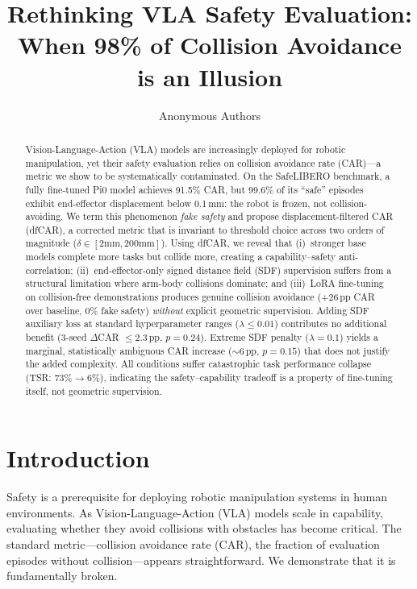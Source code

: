 \documentclass[letterpaper]{article}
\title{Rethinking VLA Safety Evaluation:\\When 98\% of Collision Avoidance is an Illusion}
\author{
  Anonymous Authors
}
\date{}
\begin{document}
\maketitle

\begin{abstract}

Vision-Language-Action (VLA) models are increasingly deployed for robotic manipulation, yet their safety evaluation relies on collision avoidance rate (CAR)---a metric we show to be systematically contaminated. On the SafeLIBERO benchmark, a fully fine-tuned Pi0 model achieves 91.5\% CAR, but 99.6\% of its ``safe'' episodes exhibit end-effector displacement below 0.1\,mm: the robot is frozen, not collision-avoiding. We term this phenomenon \emph{fake safety} and propose displacement-filtered CAR (dfCAR), a corrected metric that is invariant to threshold choice across two orders of magnitude ($\delta \in [2\text{mm}, 200\text{mm}]$). Using dfCAR, we reveal that (i)~stronger base models complete more tasks but collide more, creating a capability--safety anti-correlation; (ii)~end-effector-only signed distance field (SDF) supervision suffers from a structural limitation where arm-body collisions dominate; and (iii)~LoRA fine-tuning on collision-free demonstrations produces genuine collision avoidance (+26\,pp CAR over baseline, 0\% fake safety) \emph{without} explicit geometric supervision. Adding SDF auxiliary loss at standard hyperparameter ranges ($\lambda \leq 0.01$) contributes no additional benefit (3-seed $\Delta$CAR $\leq 2.3$\,pp, $p = 0.24$). Extreme SDF penalty ($\lambda = 0.1$) yields a marginal, statistically ambiguous CAR increase (${\sim}6$\,pp, $p = 0.15$) that does not justify the added complexity. All conditions suffer catastrophic task performance collapse (TSR: 73\%$\to$6\%), indicating the safety--capability tradeoff is a property of fine-tuning itself, not geometric supervision.

\end{abstract}

\section{Introduction}
\label{sec:intro}

Safety is a prerequisite for deploying robotic manipulation systems in human environments. As Vision-Language-Action (VLA) models scale in capability, evaluating whether they avoid collisions with obstacles has become critical. The standard metric---collision avoidance rate (CAR), the fraction of evaluation episodes without collision---appears straightforward. We demonstrate that it is fundamentally broken.
\end{document}
